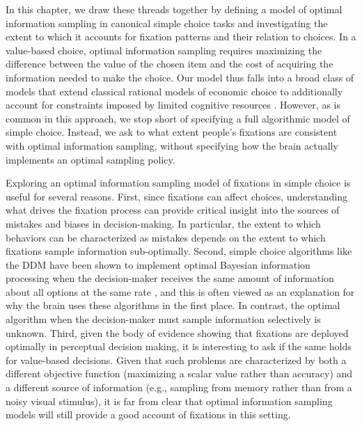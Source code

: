 In this chapter, we draw these threads together by defining a model of optimal information sampling in canonical simple choice tasks and investigating the extent to which it accounts for fixation patterns and their relation to choices.  In a value-based choice, optimal information sampling requires maximizing the difference between the value of the chosen item and the cost of acquiring the information needed to make the choice. Our model thus falls into a broad class of models that extend classical rational models of economic choice \citep{savage1954foundations,vonneumann1944theory} to additionally account for constraints imposed by limited cognitive resources \citep{lewis2014computational,griffiths2015rational,lieder2020resourcerational,gershman2015computational,sims1998stickiness,caplin2013behavioral}. However, as is common in this approach, we stop short of specifying a full algorithmic model of simple choice. Instead, we ask to what extent people's fixations are consistent with optimal information sampling, without specifying how the brain actually implements an optimal sampling policy.

Exploring an optimal information sampling model of fixations in simple choice is useful for several reasons. First, since fixations can affect choices, understanding what drives the fixation process can provide critical insight into the sources of mistakes and biases in decision-making. In particular, the extent to which behaviors can be characterized as mistakes depends on the extent to which fixations sample information sub-optimally. 
Second, simple choice algorithms like the DDM have been shown to implement optimal Bayesian information processing when the decision-maker receives the same amount of information about all options at the same rate \citep{bogacz2006physics,moreno-bote2010decision,drugowitsch2012cost,bitzer2014perceptual,tajima2016optimal,tajima2019optimal,fudenberg2018speed}, and this is often viewed as an explanation for why the brain uses these algorithms in the first place. In contrast, the optimal algorithm when the decision-maker must sample information selectively is unknown. Third, given the body of evidence showing that fixations are deployed optimally in perceptual decision making, it is interesting to ask if the same holds for value-based decisions. Given that such problems are characterized by both a different objective function (maximizing a scalar value rather than accuracy) and a different source of information (e.g., sampling from memory \citealp{biderman2020what,bakkour2019hippocampus,wang2022mixing} rather than from a noisy visual stimulus), it is far from clear that optimal information sampling models will still provide a good account of fixations in this setting.

